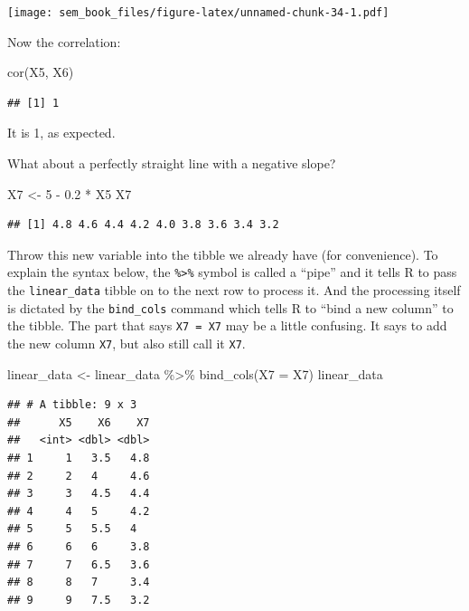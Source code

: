 \documentclass[
]{book}
\newenvironment{Shaded}{\begin{snugshade}}{\end{snugshade}}
\newcommand{\AttributeTok}[1]{\textcolor[rgb]{0.77,0.63,0.00}{#1}}
\newcommand{\DecValTok}[1]{\textcolor[rgb]{0.00,0.00,0.81}{#1}}
\newcommand{\FloatTok}[1]{\textcolor[rgb]{0.00,0.00,0.81}{#1}}
\newcommand{\FunctionTok}[1]{\textcolor[rgb]{0.00,0.00,0.00}{#1}}
\newcommand{\NormalTok}[1]{#1}
\newcommand{\OtherTok}[1]{\textcolor[rgb]{0.56,0.35,0.01}{#1}}
\newcommand{\SpecialCharTok}[1]{\textcolor[rgb]{0.00,0.00,0.00}{#1}}
\begin{document}
\texttt{[image: sem\_book\_files/figure-latex/unnamed-chunk-34-1.pdf]}

Now the correlation:

\begin{Shaded}
\begin{Highlighting}[]
\FunctionTok{cor}\NormalTok{(X5, X6)}
\end{Highlighting}
\end{Shaded}

\begin{verbatim}
## [1] 1
\end{verbatim}

It is 1, as expected.

What about a perfectly straight line with a negative slope?

\begin{Shaded}
\begin{Highlighting}[]
\NormalTok{X7 }\OtherTok{\textless{}{-}} \DecValTok{5} \SpecialCharTok{{-}} \FloatTok{0.2} \SpecialCharTok{*}\NormalTok{ X5}
\NormalTok{X7}
\end{Highlighting}
\end{Shaded}

\begin{verbatim}
## [1] 4.8 4.6 4.4 4.2 4.0 3.8 3.6 3.4 3.2
\end{verbatim}

Throw this new variable into the tibble we already have (for convenience). To explain the syntax below, the \texttt{\%\textgreater{}\%} symbol is called a ``pipe'' and it tells R to pass the \texttt{linear\_data} tibble on to the next row to process it. And the processing itself is dictated by the \texttt{bind\_cols} command which tells R to ``bind a new column'' to the tibble. The part that says \texttt{X7\ =\ X7} may be a little confusing. It says to add the new column \texttt{X7}, but also still call it \texttt{X7}.

\begin{Shaded}
\begin{Highlighting}[]
\NormalTok{linear\_data }\OtherTok{\textless{}{-}}\NormalTok{ linear\_data }\SpecialCharTok{\%\textgreater{}\%}
    \FunctionTok{bind\_cols}\NormalTok{(}\AttributeTok{X7 =}\NormalTok{ X7)}
\NormalTok{linear\_data}
\end{Highlighting}
\end{Shaded}

\begin{verbatim}
## # A tibble: 9 x 3
##      X5    X6    X7
##   <int> <dbl> <dbl>
## 1     1   3.5   4.8
## 2     2   4     4.6
## 3     3   4.5   4.4
## 4     4   5     4.2
## 5     5   5.5   4  
## 6     6   6     3.8
## 7     7   6.5   3.6
## 8     8   7     3.4
## 9     9   7.5   3.2
\end{verbatim}
\end{document}
